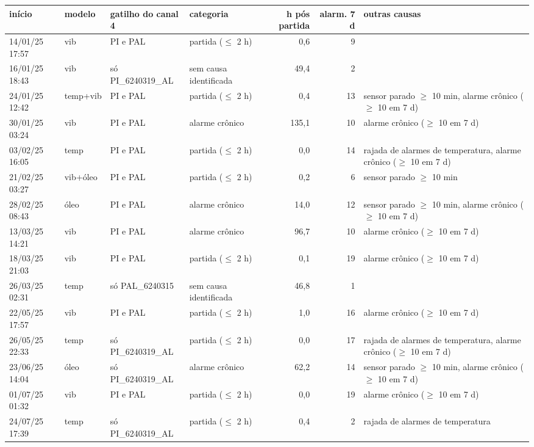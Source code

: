\begin{longtable}{l >{\raggedright\arraybackslash}p{1.4cm} >{\raggedright\arraybackslash}p{2.4cm} >{\raggedright\arraybackslash}p{2.9cm} r r >{\raggedright\arraybackslash}p{3.6cm}}
\toprule
início & modelo & gatilho do canal 4 & categoria & h pós partida & alarm. 7 d & outras causas \\
\midrule
\endhead
14/01/25 17:57 & vib & PI e PAL & partida ($\leq$ 2 h) & 0,6 & 9 &  \\
16/01/25 18:43 & vib & só PI\_6240319\_AL & sem causa identificada & 49,4 & 2 &  \\
24/01/25 12:42 & temp+vib & PI e PAL & partida ($\leq$ 2 h) & 0,4 & 13 & sensor parado $\geq$ 10 min, alarme crônico ($\geq$ 10 em 7 d) \\
30/01/25 03:24 & vib & PI e PAL & alarme crônico & 135,1 & 10 & alarme crônico ($\geq$ 10 em 7 d) \\
03/02/25 16:05 & temp & PI e PAL & partida ($\leq$ 2 h) & 0,0 & 14 & rajada de alarmes de temperatura, alarme crônico ($\geq$ 10 em 7 d) \\
21/02/25 03:27 & vib+óleo & PI e PAL & partida ($\leq$ 2 h) & 0,2 & 6 & sensor parado $\geq$ 10 min \\
28/02/25 08:43 & óleo & PI e PAL & alarme crônico & 14,0 & 12 & sensor parado $\geq$ 10 min, alarme crônico ($\geq$ 10 em 7 d) \\
13/03/25 14:21 & vib & PI e PAL & alarme crônico & 96,7 & 10 & alarme crônico ($\geq$ 10 em 7 d) \\
18/03/25 21:03 & vib & PI e PAL & partida ($\leq$ 2 h) & 0,1 & 19 & alarme crônico ($\geq$ 10 em 7 d) \\
26/03/25 02:31 & temp & só PAL\_6240315 & sem causa identificada & 46,8 & 1 &  \\
22/05/25 17:57 & vib & PI e PAL & partida ($\leq$ 2 h) & 1,0 & 16 & alarme crônico ($\geq$ 10 em 7 d) \\
26/05/25 22:33 & temp & só PI\_6240319\_AL & partida ($\leq$ 2 h) & 0,0 & 17 & rajada de alarmes de temperatura, alarme crônico ($\geq$ 10 em 7 d) \\
23/06/25 14:04 & óleo & só PI\_6240319\_AL & alarme crônico & 62,2 & 14 & sensor parado $\geq$ 10 min, alarme crônico ($\geq$ 10 em 7 d) \\
01/07/25 01:32 & vib & PI e PAL & partida ($\leq$ 2 h) & 0,0 & 19 & alarme crônico ($\geq$ 10 em 7 d) \\
24/07/25 17:39 & temp & só PI\_6240319\_AL & partida ($\leq$ 2 h) & 0,4 & 2 & rajada de alarmes de temperatura \\

\end{longtable}
